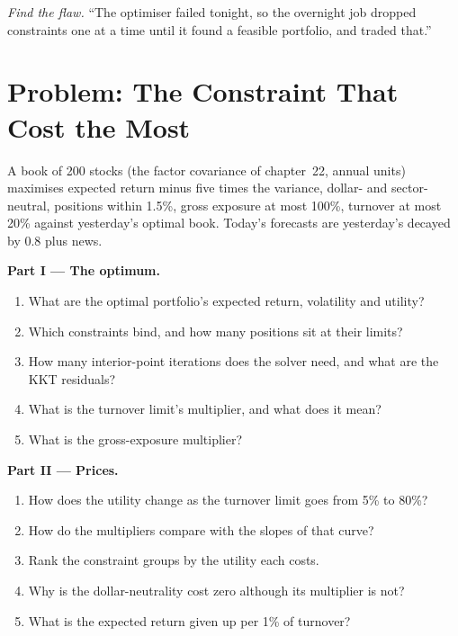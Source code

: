 \begin{exercise}[$\star\star\star$]\label{exo:qm:convex-optimisation:8}
\emph{Find the flaw.} ``The optimiser failed tonight, so the overnight job dropped constraints one at a time until it found a feasible portfolio, and traded that.''
\end{exercise}

\section{Problem: The Constraint That Cost the Most}

\begin{problem}\label{pb:qm:convex-optimisation:1}
A book of 200 stocks (the factor covariance of chapter~22, annual units) maximises expected return minus five times the variance, dollar- and sector-neutral, positions within 1.5\%, gross
exposure at most 100\%, turnover at most 20\% against yesterday's optimal book. Today's forecasts are yesterday's decayed by 0.8 plus news.

\medskip\noindent\textbf{Part I --- The optimum.}
\begin{enumerate}
\item What are the optimal portfolio's expected return, volatility and utility?
\item Which constraints bind, and how many positions sit at their limits?
\item How many interior-point iterations does the solver need, and what are the KKT residuals?
\item What is the turnover limit's multiplier, and what does it mean?
\item What is the gross-exposure multiplier?
\end{enumerate}

\medskip\noindent\textbf{Part II --- Prices.}
\begin{enumerate}[resume]
\item How does the utility change as the turnover limit goes from 5\% to 80\%?
\item How do the multipliers compare with the slopes of that curve?
\item Rank the constraint groups by the utility each costs.
\item Why is the dollar-neutrality cost zero although its multiplier is not?
\item What is the expected return given up per 1\% of turnover?
\end{enumerate}


\end{problem}
